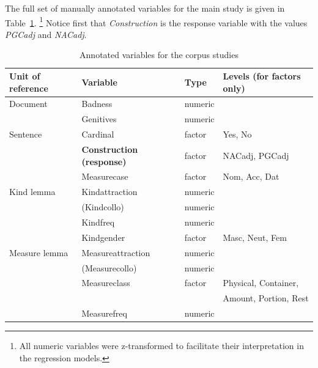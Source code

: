 The full set of manually annotated variables for the main study is given in Table~\ref{tab:variables}.%
\footnote{All numeric variables were z-transformed to facilitate their interpretation in the regression models.}
Notice first that \textit{Construction} is the response variable with the values \textit{PGCadj} and \textit{NACadj}.

\begin{table}
  \centering
  \begin{tabular}{llll}
    Unit of reference & Variable                      & Type    & Levels (for factors only) \\
    \midrule
    Document       & Badness                          & numeric &                           \\
                   & Genitives                        & numeric &                           \\
    Sentence       & Cardinal                         & factor  & Yes, No                   \\
                   & \textbf{Construction (response)} & factor  & NACadj, PGCadj            \\
                   & Measurecase                      & factor  & Nom, Acc, Dat             \\
    Kind lemma     & Kindattraction                   & numeric &                           \\
                   & (Kindcollo)                      & numeric &                           \\
                   & Kindfreq                         & numeric &                           \\
		   & Kindgender                       & factor  & Masc, Neut, Fem             \\
    Measure lemma  & Measureattraction                & numeric &                           \\
                   & (Measurecollo)                   & numeric &                           \\
                   & Measureclass                     & factor  & Physical, Container,      \\
                   &                                  &         & Amount, Portion, Rest     \\
                   & Measurefreq                      & numeric &                           \\
  \end{tabular}
  \caption{Annotated variables for the corpus studies}
  \label{tab:variables}
\end{table}


